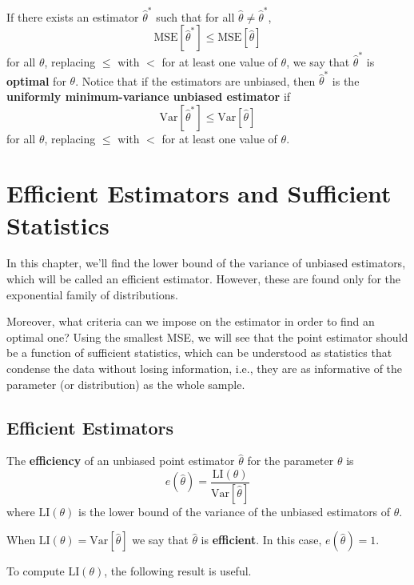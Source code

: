 \documentclass[12pt,a4paper]{report}
\begin{document}
If there exists an estimator $\hat{\theta}^\ast$ such that for all $\hat{\theta} \neq \hat{\theta}^\ast$, 
\begin{equation*}
    \text{MSE}[\hat{\theta}^\ast] \leq \text{MSE}[\hat{\theta}] 
\end{equation*}
for all $\theta$, replacing $\leq$ with $<$ for at least one value of $\theta$, we say that $\hat{\theta}^\ast$ is \textbf{optimal} for $\theta$. Notice that if the estimators are unbiased, then $\hat{\theta}^\ast$ is the \textbf{uniformly minimum-variance unbiased estimator} if 
\[
    \text{Var}[\hat{\theta}^\ast] \leq \text{Var}[\hat{\theta}]
\]
for all $\theta$, replacing $\leq$ with $<$ for at least one value of $\theta$.

\chapter{Efficient Estimators and Sufficient Statistics}

In this chapter, we'll find the lower bound of the variance of unbiased estimators, which will be called an efficient estimator. However, these are found only for the exponential family of distributions.

Moreover, what criteria can we impose on the estimator in order to find an optimal one? Using the smallest MSE, we will see that the point estimator should be a function of sufficient statistics, which can be understood as statistics that condense the data without losing information, i.e., they are as informative of the parameter (or distribution) as the whole sample. 

\section{Efficient Estimators}

\begin{definition}
    The \textbf{efficiency} of an unbiased point estimator $\hat{\theta}$ for the parameter $\theta$ is  
    \[
        e(\hat{\theta}) = \frac{\text{LI}(\theta)}{\text{Var}[\hat{\theta}]}
    \]
    where $\text{LI}(\theta)$ is the lower bound of the variance of the unbiased estimators of $\theta$.

    When $\text{LI}(\theta) = \text{Var}[\hat{\theta}]$ we say that $\hat{\theta}$ is \textbf{efficient}. In this case, $e(\hat{\theta}) = 1$.
\end{definition}

To compute $\text{LI}(\theta)$, the following result is useful.
\end{document}
